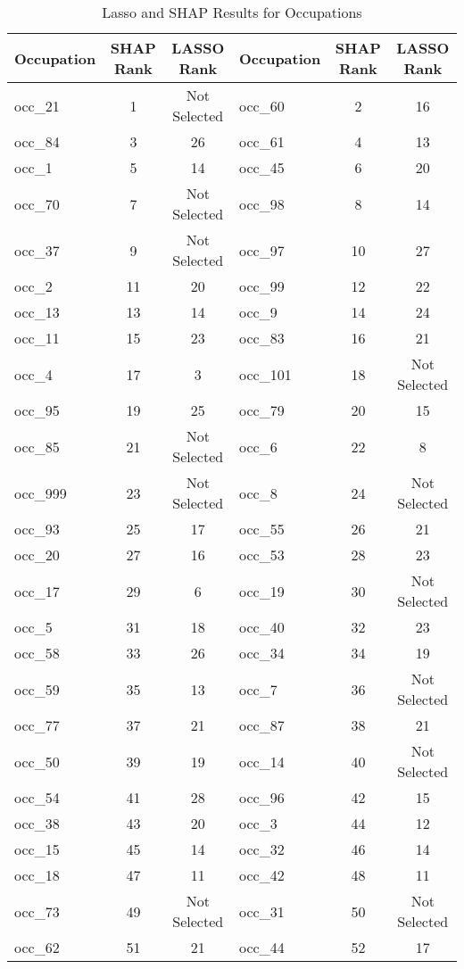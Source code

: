 \documentclass[12pt]{article}
\begin{document}
\begin{table}[H]
\centering
\caption{Lasso and SHAP Results for Occupations}

\footnotesize  %

\begin{tabular}{lcc|lcc}
\toprule
Occupation & SHAP Rank & LASSO Rank & Occupation & SHAP Rank & LASSO Rank \\
\midrule
occ\_21 & 1 & Not Selected & occ\_60 & 2 & 16 \\
occ\_84 & 3 & 26 & occ\_61 & 4 & 13 \\
occ\_1 & 5 & 14 & occ\_45 & 6 & 20 \\
occ\_70 & 7 & Not Selected & occ\_98 & 8 & 14 \\
occ\_37 & 9 & Not Selected & occ\_97 & 10 & 27 \\
occ\_2 & 11 & 20 & occ\_99 & 12 & 22 \\
occ\_13 & 13 & 14 & occ\_9 & 14 & 24 \\
occ\_11 & 15 & 23 & occ\_83 & 16 & 21 \\
occ\_4 & 17 & 3 & occ\_101 & 18 & Not Selected \\
occ\_95 & 19 & 25 & occ\_79 & 20 & 15 \\
occ\_85 & 21 & Not Selected & occ\_6 & 22 & 8 \\
occ\_999 & 23 & Not Selected & occ\_8 & 24 & Not Selected \\
occ\_93 & 25 & 17 & occ\_55 & 26 & 21 \\
occ\_20 & 27 & 16 & occ\_53 & 28 & 23 \\
occ\_17 & 29 & 6 & occ\_19 & 30 & Not Selected \\
occ\_5 & 31 & 18 & occ\_40 & 32 & 23 \\
occ\_58 & 33 & 26 & occ\_34 & 34 & 19 \\
occ\_59 & 35 & 13 & occ\_7 & 36 & Not Selected \\
occ\_77 & 37 & 21 & occ\_87 & 38 & 21 \\
occ\_50 & 39 & 19 & occ\_14 & 40 & Not Selected \\
occ\_54 & 41 & 28 & occ\_96 & 42 & 15 \\
occ\_38 & 43 & 20 & occ\_3 & 44 & 12 \\
occ\_15 & 45 & 14 & occ\_32 & 46 & 14 \\
occ\_18 & 47 & 11 & occ\_42 & 48 & 11 \\
occ\_73 & 49 & Not Selected & occ\_31 & 50 & Not Selected \\
occ\_62 & 51 & 21 & occ\_44 & 52 & 17 \\

\end{tabular}
\end{table}
\end{document}

